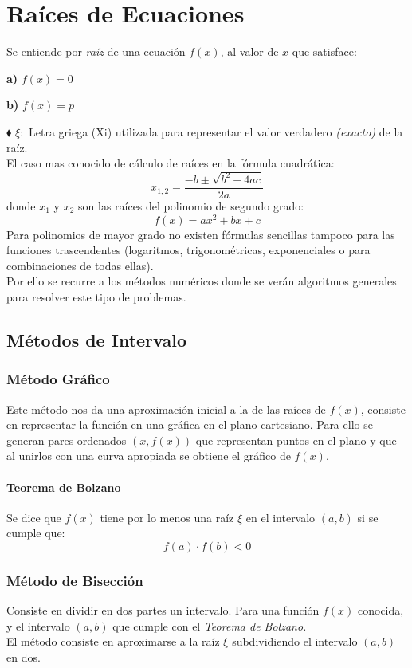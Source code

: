 \chapter{Raíces de Ecuaciones}
Se entiende por \textit{raíz} de una ecuación $f(x)$, al valor de $x$ que satisface:
\begin{multicols}{2}
\textbf{a)} $f(x)=0$
\columnbreak
\begin{flushleft}
\textbf{b)} $f(x)=p$
\end{flushleft}
\end{multicols}
$\blacklozenge$ $\xi:$ Letra griega (Xi) utilizada para representar el valor verdadero \textit{(exacto)} de la raíz.
\\${ }$\\
El caso mas conocido de cálculo de raíces en la fórmula cuadrática:
$$x_{1,2}=\dfrac{-b \pm \sqrt{b^2 - 4ac}}{2a}$$
donde $x_1$ y $x_2$ son las raíces del polinomio de segundo grado:
$$f(x)=ax^2+bx+c$$
Para polinomios de mayor grado no  existen fórmulas sencillas tampoco para las funciones trascendentes (logaritmos, trigonométricas, exponenciales o para combinaciones de todas ellas).
\\${ }$\\
Por ello se recurre a los métodos numéricos donde se verán algoritmos generales para resolver este tipo de problemas.
\section{Métodos de Intervalo}
\subsection{Método Gráfico}
Este método nos da una aproximación inicial a la de las raíces de $f(x)$, consiste en representar la función en una gráfica en el plano cartesiano. Para ello se generan pares ordenados $(x,f(x))$ que representan puntos en el plano y que al unirlos con una curva apropiada se obtiene el gráfico de $f(x)$.
\subsubsection{Teorema de Bolzano}
Se dice que $f(x)$ tiene por lo menos una raíz $\xi$ en el intervalo $(a,b)$ si se cumple que:
$$f(a)\cdot f(b) < 0$$
\subsection{Método de Bisección}
Consiste en dividir en dos partes un intervalo. Para una función $f(x)$ conocida, y el intervalo $(a,b)$ que cumple con el \textit{Teorema de Bolzano.}
\\${ }$\\
El método consiste en aproximarse a la raíz $\xi$ subdividiendo el intervalo $(a,b)$ en dos.
